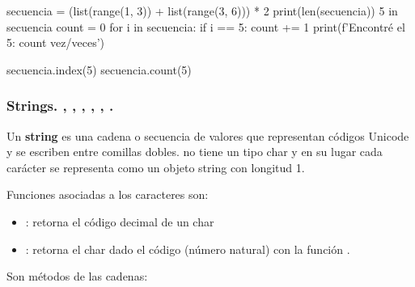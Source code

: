 \hfil
\begin{minipage}{.7\textwidth}
\begin{pyconsole}[][frame=single]
secuencia = (list(range(1, 3)) + list(range(3, 6))) * 2
print(len(secuencia))
5 in secuencia
count = 0
for i in secuencia:
  if i == 5:
     count += 1
     print(f'Encontré el 5: {count} vez/veces')

secuencia.index(5)
secuencia.count(5)

\end{pyconsole}
\end{minipage}



\subsubsection*{Strings.   , , , , , .}

Un \textbf{string} es una cadena o secuencia de valores que representan códigos Unicode y se escriben entre comillas dobles.  no tiene un tipo char y en su lugar cada carácter se representa como un objeto string con longitud 1. 


 
Funciones asociadas a los caracteres son:
 
 \begin{itemize}
 \item {}: retorna el código decimal de un char
 \item {}: retorna el char dado el código (número natural) con la función .
\end{itemize}


Son métodos de las cadenas:

